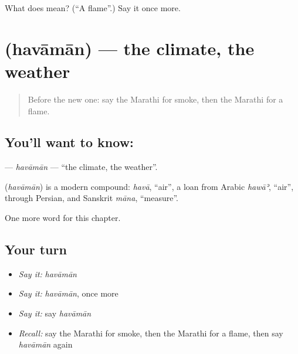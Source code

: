 \begin{tcolorbox}[breakable,colback=teal!4,colframe=teal!35!black,title={Before you move on}]
What does  mean? (\textquotedblleft{}A flame\textquotedblright{}.) Say it once more.
\end{tcolorbox}
\section[\texorpdfstring{\mr{हवामान} (havāmān)}{हवामान (havāmān)}]{ (havāmān) — the climate, the weather}

\label{lesson:MR-C184-havaman}



\begin{quote}
Before the new one: say the Marathi for smoke, then the Marathi for a flame.
\end{quote}

\subsection*{You'll want to know: }
\textbf{} — \emph{havāmān} — \textquotedblleft{}the climate, the weather\textquotedblright{}.

\begin{cousinweb}
\textbf{} (\emph{havāmān}) is a modern compound: \emph{havā}, \textquotedblleft{}air\textquotedblright{}, a loan from Arabic \emph{hawāʾ}, \textquotedblleft{}air\textquotedblright{}, through Persian, and Sanskrit \emph{māna}, \textquotedblleft{}measure\textquotedblright{}.
\end{cousinweb}

\begin{grammarlens}[title={What you've built}]
One more word for this chapter.
\end{grammarlens}

\subsection*{Your turn}
\begin{itemize}
\raggedright
  \item \emph{Say it:} \emph{havāmān}
  \item \emph{Say it:} \emph{havāmān}, once more
  \item \emph{Say it:} say \emph{havāmān}
  \item \emph{Recall:} say the Marathi for smoke, then the Marathi for a flame, then say \emph{havāmān} again
\end{itemize}


